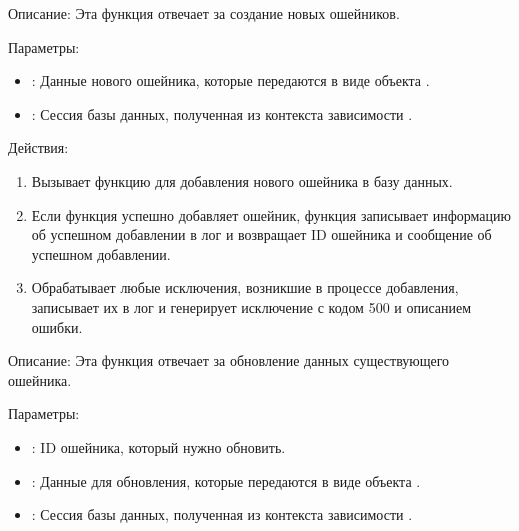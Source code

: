 \documentclass[letterpaper,10pt,russian]{sphinxmanual}
\begin{document}
\sphinxAtStartPar
Описание: Эта функция отвечает за создание новых ошейников.

\sphinxAtStartPar
Параметры:
\begin{itemize}
\item {} 
\sphinxAtStartPar
{}: Данные нового ошейника, которые передаются в виде объекта .

\item {} 
\sphinxAtStartPar
{}: Сессия базы данных, полученная из контекста зависимости .

\end{itemize}

\sphinxAtStartPar
Действия:
\begin{enumerate}
%
\item {} 
\sphinxAtStartPar
Вызывает функцию  для добавления нового ошейника в базу данных.

\item {} 
\sphinxAtStartPar
Если функция  успешно добавляет ошейник, функция записывает информацию об успешном добавлении в лог и возвращает ID ошейника и сообщение об успешном добавлении.

\item {} 
\sphinxAtStartPar
Обрабатывает любые исключения, возникшие в процессе добавления, записывает их в лог и генерирует исключение  с кодом 500 и описанием ошибки.

\end{enumerate}

\sphinxAtStartPar
{}

\sphinxAtStartPar
Описание: Эта функция отвечает за обновление данных существующего ошейника.

\sphinxAtStartPar
Параметры:
\begin{itemize}
\item {} 
\sphinxAtStartPar
{}: ID ошейника, который нужно обновить.

\item {} 
\sphinxAtStartPar
{}: Данные для обновления, которые передаются в виде объекта .

\item {} 
\sphinxAtStartPar
{}: Сессия базы данных, полученная из контекста зависимости .

\end{itemize}
\end{document}
